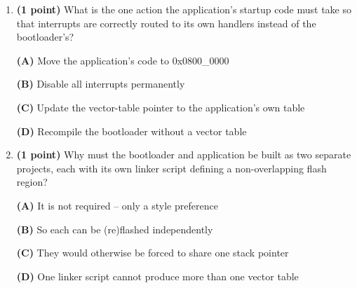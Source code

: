 \documentclass[20pt]{extarticle}
\begin{document}
\begin{enumerate}[label=\textbf{\arabic*.}, leftmargin=*, itemsep=2pt]
\newpage

\begin{enumerate}[resume, label=(\alph*), leftmargin=*, itemsep=6pt]
\item \textbf{(1 point)} What is the one action the application's startup code must take so that interrupts are correctly routed to its own handlers instead of the bootloader's?

\begin{center}
\textbf{(A)} Move the application's code to 0x0800\_0000

\textbf{(B)} Disable all interrupts permanently

\textbf{(C)} Update the vector-table pointer to the application's own table

\textbf{(D)} Recompile the bootloader without a vector table
\end{center}

\item \textbf{(1 point)} Why must the bootloader and application be built as two separate projects, each with its own linker script defining a non-overlapping flash region?

\begin{center}
\textbf{(A)} It is not required -- only a style preference

\textbf{(B)} So each can be (re)flashed independently

\textbf{(C)} They would otherwise be forced to share one stack pointer

\textbf{(D)} One linker script cannot produce more than one vector table
\end{center}
\end{enumerate}

\end{enumerate}
\end{document}
